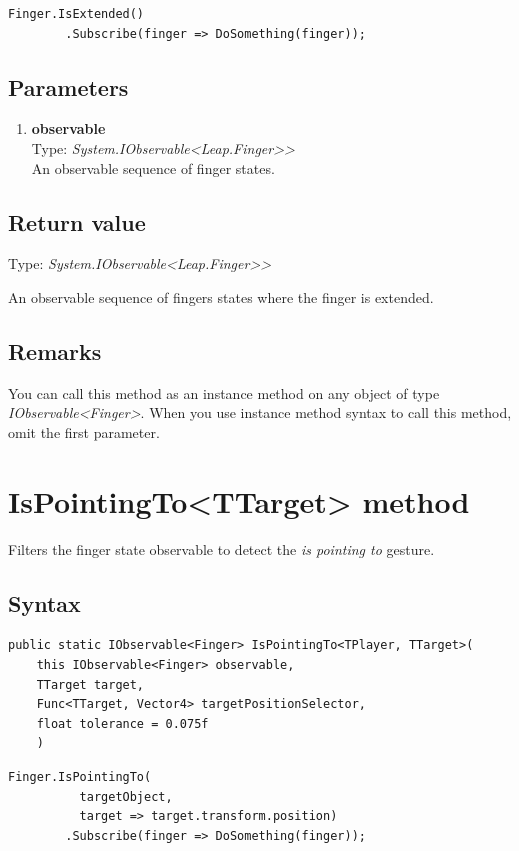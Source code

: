 \documentclass[12pt,a4paper,twoside]{report}
\begin{document}
\begin{lstlisting}[caption=Usage example]
  Finger.IsExtended()
        .Subscribe(finger => DoSomething(finger));
\end{lstlisting}

\subsection{Parameters}
\begin{enumerate}
  \item \textbf{observable}\\
    Type: \textit{System.IObservable<Leap.Finger>{}>}\\
    An observable sequence of finger states.
\end{enumerate}

\subsection{Return value}
Type: \textit{System.IObservable<Leap.Finger>{}>}

An observable sequence of fingers states where the finger is extended.

\subsection{Remarks}
You can call this method as an instance method on any object of type \textit{IObservable<Finger>}. When you use instance method syntax to call this method, omit the first parameter.

\section{IsPointingTo<TTarget> method}
Filters the finger state observable to detect the \textit{is pointing to} gesture.

\subsection{Syntax}
\begin{lstlisting}[caption=Declaration]
  public static IObservable<Finger> IsPointingTo<TPlayer, TTarget>(
    this IObservable<Finger> observable,
    TTarget target,
    Func<TTarget, Vector4> targetPositionSelector,
    float tolerance = 0.075f
    )  
\end{lstlisting}

\begin{lstlisting}[caption=Usage example]
  Finger.IsPointingTo(
          targetObject,
          target => target.transform.position)
        .Subscribe(finger => DoSomething(finger));
\end{lstlisting}
\end{document}

